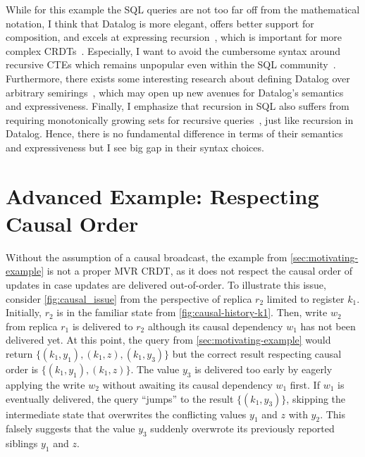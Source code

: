 While for this example the SQL queries are not too far off from the mathematical
notation, I think that Datalog is more elegant, offers better support for
composition, and excels at expressing recursion~\cite{abo2024convergence},
which is important for more complex CRDTs~\cite{kleppmann2018data}.
Especially, I want to avoid the cumbersome syntax around recursive
CTEs which remains unpopular even within the SQL
community~\cite{neumann2024critique, hirn2023fix, mcsherry2022recursion}.
Furthermore, there exists some interesting research about defining Datalog
over arbitrary semirings~\cite{abo2024convergence, khamis2022datalog},
which may open up new avenues for Datalog's semantics and expressiveness.
Finally, I emphasize that recursion in SQL also suffers from requiring
monotonically growing sets for recursive queries~\cite{hirn2023fix},
just like recursion in Datalog.
Hence, there is no fundamental difference in terms of their semantics and
expressiveness but I see big gap in their syntax choices.

\section{Advanced Example: Respecting Causal Order}\label{sec:advanced_example}



Without the assumption of a causal broadcast,
the example from \autoref{sec:motivating-example} is not a proper \ac{MVR} \ac{CRDT},
as it does not respect the causal order of updates in case updates are delivered
out-of-order.
To illustrate this issue, consider \autoref{fig:causal_issue} from the
perspective of replica \(r_2\) limited to register \(k_1\).
Initially, \(r_2\) is in the familiar state from \autoref{fig:causal-history-k1}.
Then, write \(w_2\) from replica \(r_1\) is delivered to \(r_2\) although its
causal dependency \(w_1\) has not been delivered yet.
At this point, the query from \autoref{sec:motivating-example} would return
\(\{ (k_1, y_1), (k_1, z), (k_1, y_3)\} \)
but the correct result respecting causal order is
\(\{ (k_1, y_1), (k_1, z) \}\).
The value \(y_3\) is delivered too early by eagerly applying the write \(w_2\)
without awaiting its causal dependency \(w_1\) first.
If \(w_1\) is eventually delivered, the query ``jumps'' to the result
\( \{ (k_1, y_3) \} \), skipping the intermediate state
that overwrites the conflicting values \(y_1\) and \(z\) with \(y_2\).
This falsely suggests that the value \(y_3\) suddenly overwrote its previously
reported siblings \(y_1\) and \(z\).

